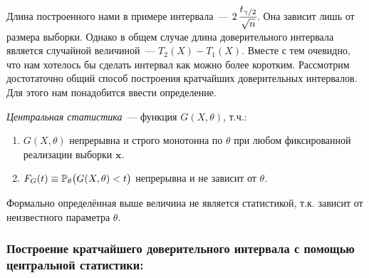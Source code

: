 Длина построенного нами в примере интервала~--- $2\, \cfrac{t_{\gamma / 2}}{\sqrt{n}}$.
Она зависит лишь от размера выборки.
Однако в общем случае длина доверительного интервала является случайной величиной~--- $T_2(X) - T_1(X)$.
Вместе с тем очевидно, что нам хотелось бы сделать интервал как можно более коротким.
Рассмотрим достотаточно общий способ построения кратчайших доверительных интервалов.
Для этого нам понадобится ввести определение.

\begin{defn}
    \textit{Центральная статистика}~--- функция $G(X,\theta)$, т.ч.:
    \begin{enumerate}
        \item $G(X,\theta)$ непрерывна и строго монотонна по $\theta$ при любом фиксированной реализации выборки $\boldsymbol{x}$. 
        \item $F_G (t) \equiv \mathbb{P}_{\theta} \bigl(G(X, \theta) < t\bigr)$ непрерывна и не зависит от $\theta$.
    \end{enumerate}
\end{defn}

\begin{rmrk}
    Формально определённая выше величина не является статистикой, т.к. зависит от неизвестного параметра $\theta$.
\end{rmrk}

\subsubsection{Построение кратчайшего доверительного интервала с помощью центральной статистики:}

